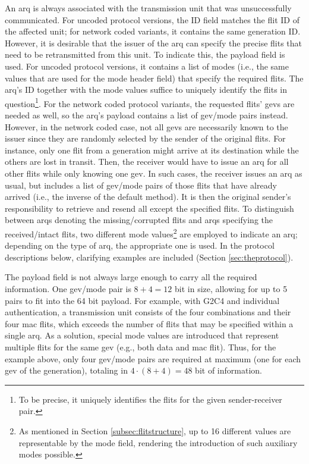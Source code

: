 An \gls{arq} is always associated with the transmission unit that was unsuccessfully communicated. For uncoded protocol versions, the ID field
matches the flit ID of the affected unit; for network coded variants, it contains the same generation ID. However, it is desirable that the issuer of the
\gls{arq} can specify the precise flits that need to be retransmitted from this unit. To indicate this, the payload field is used. For uncoded
protocol versions, it contains a list of modes (i.e., the same values that are used for the mode header field) that specify the required flits. The
\gls{arq}'s ID together with the mode values suffice to uniquely identify the flits in question\footnote{To be precise, it uniquely identifies the flits
for the given sender-receiver pair.}. For the network coded protocol variants, the requested flits' \glspl{gev} are needed as well, so the \gls{arq}'s
payload contains a list of \gls{gev}/mode pairs instead. However, in the network coded case, not all \glspl{gev} are necessarily known to the issuer
since they are randomly selected by the sender of the original flits. For instance, only one flit from a generation might arrive at its destination
while the others are lost in transit. Then, the receiver would have to issue an \gls{arq} for all other flits while only knowing one \gls{gev}. In
such cases, the receiver issues an \gls{arq} as usual, but includes a list of \gls{gev}/mode pairs of those flits that have already arrived (i.e.,
the inverse of the default method). It is then the original sender's responsibility to retrieve and resend all except the specified flits. To
distinguish between \glspl{arq} denoting the missing/corrupted flits and \glspl{arq} specifying the received/intact flits, two different mode
values\footnote{As mentioned in Section \ref{subsec:flitstructure}, up to 16 different values are representable by the mode field, rendering the
introduction of such auxiliary modes possible.} are employed to indicate an \gls{arq}; depending on the type of \gls{arq}, the appropriate one is
used. In the protocol descriptions below, clarifying examples are included (Section \ref{sec:theprotocol}).

The payload field is not always large enough to carry all the required information. One \gls{gev}/mode pair is $8+4=12$ bit in size, allowing for up to
5 pairs to fit into the 64 bit payload. For example, with G2C4 and individual authentication, a transmission unit consists of the four combinations
and their four \gls{mac} flits, which exceeds the number of flits that may be specified within a single \gls{arq}. As a solution, special mode values
are introduced that represent multiple flits for the same \gls{gev} (e.g., both data and \gls{mac} flit). Thus, for the example above, only four
\gls{gev}/mode pairs are required at maximum (one for each \gls{gev} of the generation), totaling in $4\cdot(8+4)=48$ bit of information.

